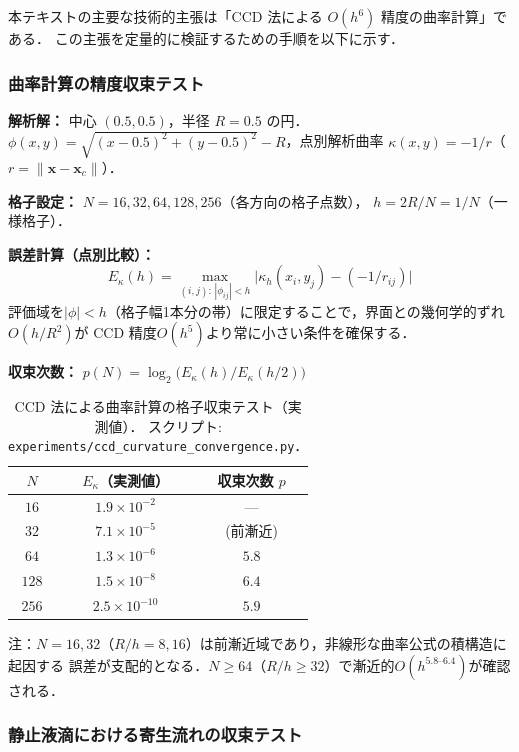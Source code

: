 本テキストの主要な技術的主張は「CCD 法による $O(h^6)$ 精度の曲率計算」である．
この主張を定量的に検証するための手順を以下に示す．

\subsubsection{曲率計算の精度収束テスト}

\begin{tcolorbox}[algbox, title={曲率 $\kappa$ の格子収束テスト手順}]
\textbf{解析解：} 中心 $(0.5,0.5)$，半径 $R=0.5$ の円．
$\phi(x,y) = \sqrt{(x-0.5)^2+(y-0.5)^2} - R$，点別解析曲率
$\kappa(x,y) = -1/r$（$r = \|\bm{x}-\bm{x}_c\|$）．

\textbf{格子設定：} $N = 16, 32, 64, 128, 256$（各方向の格子点数），
$h = 2R/N = 1/N$（一様格子）．

\textbf{誤差計算（点別比較）：}
\[
  E_\kappa(h) = \max_{(i,j):\,|\phi_{ij}|<h}
    \bigl|\kappa_h(x_i,y_j) - (-1/r_{ij})\bigr|
\]
評価域を$|\phi|<h$（格子幅1本分の帯）に限定することで，界面との幾何学的ずれ
$O(h/R^2)$が CCD 精度$O(h^5)$より常に小さい条件を確保する．

\textbf{収束次数：} $p(N) = \log_2\!\bigl(E_\kappa(h)/E_\kappa(h/2)\bigr)$
\end{tcolorbox}

\begin{table}[htbp]
\centering
\caption{CCD 法による曲率計算の格子収束テスト（実測値）．
  スクリプト: \texttt{experiments/ccd\_curvature\_convergence.py}．}
\label{tab:grid_conv}
\begin{tabular}{ccc}
\toprule
$N$ & $E_\kappa$（実測値） & 収束次数 $p$ \\
\midrule
$16$  & $1.9 \times 10^{-2}$ & --- \\
$32$  & $7.1 \times 10^{-5}$ & (前漸近) \\
$64$  & $1.3 \times 10^{-6}$ & $5.8$ \\
$128$ & $1.5 \times 10^{-8}$ & $6.4$ \\
$256$ & $2.5 \times 10^{-10}$ & $5.9$ \\
\bottomrule
\end{tabular}

\medskip
\noindent\small
注：$N=16,32$（$R/h = 8,16$）は前漸近域であり，非線形な曲率公式の積構造に起因する
誤差が支配的となる．$N\geq 64$（$R/h\geq 32$）で漸近的$O(h^{5.8\text{--}6.4})$が確認される．
\end{table}

\subsubsection{静止液滴における寄生流れの収束テスト}

